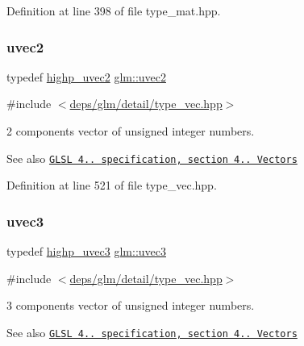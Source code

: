 Definition at line 398 of file type\+\_\+mat.\+hpp.

\mbox{\label{group__core__types_gafd2041b45eff671aa8899d2c2835eee9}} 
\subsubsection{\texorpdfstring{uvec2}{uvec2}}
{\footnotesize\ttfamily typedef \hyperlink{group__core__precision_ga34aca1cdf2130b1179fd7c5554bc1883}{highp\+\_\+uvec2} \hyperlink{group__core__types_gafd2041b45eff671aa8899d2c2835eee9}{glm\+::uvec2}}



{\ttfamily \#include $<$\hyperlink{type__vec_8hpp}{deps/glm/detail/type\+\_\+vec.\+hpp}$>$}

2 components vector of unsigned integer numbers.

\begin{DoxySeeAlso}{See also}
\href{http://www.opengl.org/registry/doc/GLSLangSpec.4.20.8.pdf}{\tt G\+L\+SL 4.. specification, section 4.. Vectors} 
\end{DoxySeeAlso}


Definition at line 521 of file type\+\_\+vec.\+hpp.

\mbox{\label{group__core__types_gac4ba593917841b859ba1683b8b52b8fa}} 
\subsubsection{\texorpdfstring{uvec3}{uvec3}}
{\footnotesize\ttfamily typedef \hyperlink{group__core__precision_ga2e16953ad75ce0c6d7faa921ca006ce5}{highp\+\_\+uvec3} \hyperlink{group__core__types_gac4ba593917841b859ba1683b8b52b8fa}{glm\+::uvec3}}



{\ttfamily \#include $<$\hyperlink{type__vec_8hpp}{deps/glm/detail/type\+\_\+vec.\+hpp}$>$}

3 components vector of unsigned integer numbers.

\begin{DoxySeeAlso}{See also}
\href{http://www.opengl.org/registry/doc/GLSLangSpec.4.20.8.pdf}{\tt G\+L\+SL 4.. specification, section 4.. Vectors} 
\end{DoxySeeAlso}


